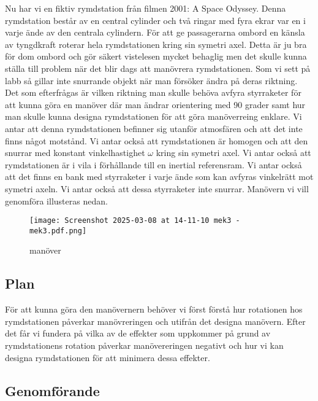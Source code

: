 \documentclass[a4paper]{article}
\begin{document}
Nu har vi en fiktiv rymdstation från filmen 2001: A Space Odyssey. Denna rymdstation består av en central cylinder och två ringar med fyra ekrar var en i varje ände av den centrala cylindern. För att ge passagerarna ombord en känsla av tyngdkraft roterar hela rymdstationen kring sin symetri axel. Detta är ju bra för dom ombord och gör säkert vistelesen mycket behaglig men det skulle kunna ställa till problem när det blir dags att manövrera rymdstationen. Som vi sett på labb så gillar inte snurrande objekt när man försöker ändra på deras riktning. Det som efterfrågas är vilken riktning man skulle behöva avfyra styrraketer för att kunna göra en manöver där man ändrar orientering med 90 grader samt hur man skulle kunna designa rymdstationen för att göra manöverreing enklare. Vi antar att denna rymdstationen befinner sig utanför atmosfären och att det inte finns något motstånd. Vi antar också att rymdstationen är homogen och att den snurrar med konstant vinkelhastighet $\omega$ kring sin symetri axel. Vi antar också att rymdstationen är i vila i förhållande till en inertial referensram. Vi antar också att det finns en bank med styrraketer i varje ände som kan avfyras vinkelrätt mot symetri axeln. Vi antar också att dessa styrraketer inte snurrar. Manövern vi vill genomföra illusteras nedan.

\begin{figure}
    \begin{small}
        \begin{center}
            \texttt{[image: Screenshot 2025-03-08 at 14-11-10 mek3 - mek3.pdf.png]}
        \end{center}
        \caption{manöver}
        \label{fig:manöver}
    \end{small}
\end{figure}


\subsection*{Plan}

För att kunna göra den manövernern behöver vi först förstå hur rotationen hos rymdstationen påverkar manövreringen och utifrån det designa manövern. Efter det får vi fundera på vilka av de effekter som uppkommer på grund av rymdstationens rotation påverkar manövereringen negativt och hur vi kan designa rymdstationen för att minimera dessa effekter.

\subsection*{Genomförande}
\end{document}
